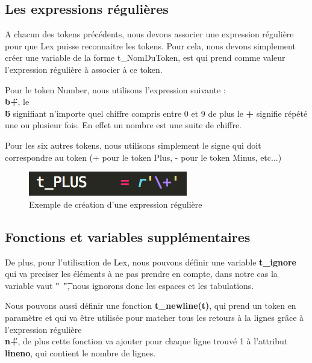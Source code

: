 \documentclass[a4paper,12pt]{article}
\begin{document}
	\subsection{Les expressions régulières}

		A chacun des tokens précédents, nous devons associer une expression régulière pour que Lex puisse reconnaitre les tokens.
		Pour cela, nous devons simplement créer une variable de la forme t\_NomDuToken, est qui prend comme valeur l'expression régulière à associer à ce token.

		Pour le token Number, nous utilisons l'expression suivante : \textbf{\"\\b+\"}, le \textbf{\"\\b\"} signifiant n'importe quel chiffre compris entre 0 et 9 de plus le \textbf{+} signifie répété une ou plusieur fois. En effet un nombre est une suite de chiffre.

		Pour les six autres tokens, nous utilisons simplement le signe qui doit correspondre au token (+ pour le token Plus, - pour le token Minus, etc...)
	
		\begin{figure}[h!]
			\begin{center}
				\includegraphics[scale=1]{imgs/exp_regex}
				\caption{Exemple de création d'une expression régulière}
			\end{center}
		\end{figure}


	\subsection{Fonctions et variables supplémentaires}

		De plus, pour l'utilisation de Lex, nous pouvons définir une variable \textbf{t\_ignore} qui va preciser les éléments à ne pas prendre en compte, dans notre cas la variable vaut \textbf{" \t"}, nous ignorons donc les espaces et les tabulations.

		Nous pouvons aussi définir une fonction \textbf{t\_newline(t)}, qui prend un token en paramètre et qui va être utilisée pour matcher tous les retours à la lignes grâce à l'expression régulière \textbf{\"\\n+\"}, de plus cette fonction va ajouter pour chaque ligne trouvé 1 à l'attribut \textbf{lineno}, qui contient le nombre de lignes.
\end{document}
